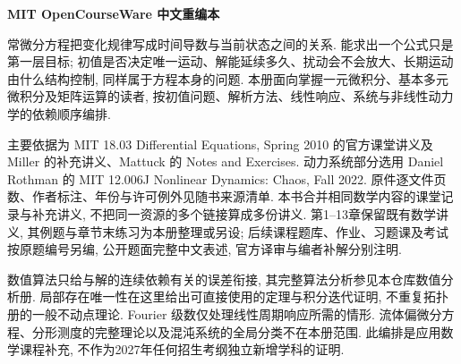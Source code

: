 \frontmatter
\begin{center}
{\color{structurecolor}\bfseries\fontsize{18}{25}\selectfont\BookTitle\par}
{\bfseries MIT OpenCourseWare 中文重编本\par}
\BookAuthor\par
\BookDate\par
\end{center}
\originalpreface
常微分方程把变化规律写成时间导数与当前状态之间的关系. 能求出一个公式只是第一层目标; 初值是否决定唯一运动、解能延续多久、扰动会不会放大、长期运动由什么结构控制, 同样属于方程本身的问题. 本册面向掌握一元微积分、基本多元微积分及矩阵运算的读者, 按初值问题、解析方法、线性响应、系统与非线性动力学的依赖顺序编排.

主要依据为 MIT 18.03 Differential Equations, Spring 2010 的官方课堂讲义及 Miller 的补充讲义、Mattuck 的 Notes and Exercises. 动力系统部分选用 Daniel Rothman 的 MIT 12.006J Nonlinear Dynamics: Chaos, Fall 2022. 原件逐文件页数、作者标注、年份与许可例外见随书来源清单. 本书合并相同数学内容的课堂记录与补充讲义, 不把同一资源的多个链接算成多份讲义. 第1--13章保留既有数学讲义, 其例题与章节末练习为本册整理或另设; 后续课程题库、作业、习题课及考试按原题编号另编, 公开题面完整中文表述, 官方译审与编者补解分别注明.

数值算法只给与解的连续依赖有关的误差衔接, 其完整算法分析参见本仓库数值分析册. 局部存在唯一性在这里给出可直接使用的定理与积分迭代证明, 不重复拓扑册的一般不动点理论. Fourier 级数仅处理线性周期响应所需的情形. 流体偏微分方程、分形测度的完整理论以及混沌系统的全局分类不在本册范围. 此编排是应用数学课程补充, 不作为2027年任何招生考纲独立新增学科的证明.


